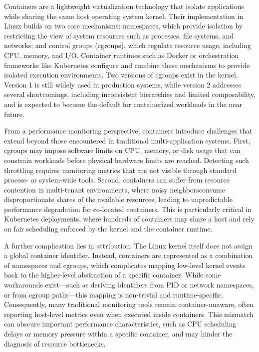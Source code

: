 Containers are a lightweight virtualization technology that isolate applications while sharing the same host operating system kernel. Their implementation in Linux builds on two core mechanisms: namespaces, which provide isolation by restricting the view of system resources such as processes, file systems, and networks; and control groups (cgroups), which regulate resource usage, including CPU, memory, and I/O. Container runtimes such as Docker or orchestration frameworks like Kubernetes configure and combine these mechanisms to provide isolated execution environments. Two versions of cgroups exist in the kernel. Version 1 is still widely used in production systems, while version 2 addresses several shortcomings, including inconsistent hierarchies and limited composability, and is expected to become the default for containerized workloads in the near future.

From a performance monitoring perspective, containers introduce challenges that extend beyond those encountered in traditional multi-application systems. First, cgroups may impose software limits on CPU, memory, or disk usage that can constrain workloads before physical hardware limits are reached. Detecting such throttling requires monitoring metrics that are not visible through standard process- or system-wide tools. Second, containers can suffer from resource contention in multi-tenant environments, where noisy neighborsconsume disproportionate shares of the available resources, leading to unpredictable performance degradation for co-located containers. This is particularly critical in Kubernetes deployments, where hundreds of containers may share a host and rely on fair scheduling enforced by the kernel and the container runtime.

A further complication lies in attribution. The Linux kernel itself does not assign a global container identifier. Instead, containers are represented as a combination of namespaces and cgroups, which complicates mapping low-level kernel events back to the higher-level abstraction of a specific container. While some workarounds exist—such as deriving identifiers from PID or network namespaces, or from cgroup paths—this mapping is non-trivial and runtime-specific. Consequently, many traditional monitoring tools remain container-unaware, often reporting host-level metrics even when executed inside containers. This mismatch can obscure important performance characteristics, such as CPU scheduling delays or memory pressure within a specific container, and may hinder the diagnosis of resource bottlenecks.

